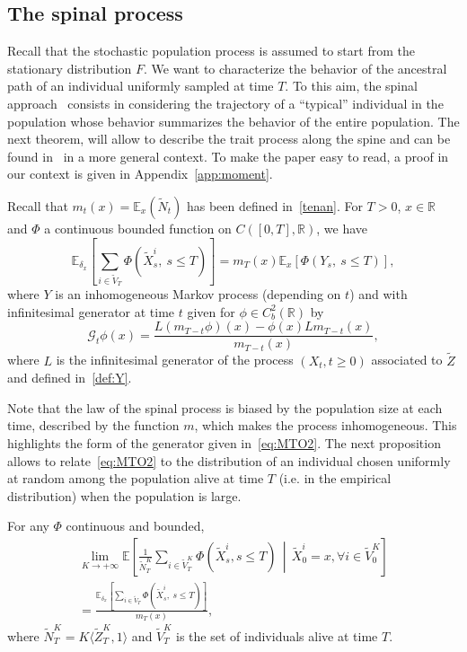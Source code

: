\documentclass[AHL,Unicode,longabstracts,published]{cedram}
\newcommand{\Go}{\mathcal{G}}
\newcommand*\R{\mathbb{R}}
\newcommand*\E{\mathbb{E}}
\let\oldforall\forall
\renewcommand*{\forall}{\mathrel{\oldforall}}
\begin{document}
\subsection{The spinal process} 
Recall that the stochastic population process is assumed to start from the stationary distribution $F$. We want to characterize the behavior of the ancestral path of an individual uniformly sampled at time $T$. To this aim, the spinal app\-roach~\cite{bansaye_limit_2011,hardyharris2,hardyharris3} consists in considering the trajectory of a ``typical'' individual in the population whose behavior summarizes the behavior of the entire population. The next theorem, will allow to describe the trait process along the spine and can be found in~\cite{Marguet2} in a more general context. To make the paper easy to read, a proof in our context is given in Appendix~\ref{app:moment}.
\begin{theo}\label{spine}
Recall that $m_t(x)=\E_x(\widetilde{N}_t)$ has been defined in~\eqref{tenan}. For $T>0$, $x\in \R$ and $\Phi$ a continuous bounded function on $C([0,T],\R)$, we have
\begin{equation}\label{eq:MTO2}
\E_{\delta_{x}}\left[\sum_{i \in \widetilde{V}_{T}}\Phi\left(\widetilde{X}^i_{s},\ s\leq T\right) \right]={m_{T}(x)}\E_{x}\left[\Phi\left(Y_{s},\ s\leq T\right) \right],
\end{equation}
where $Y$ is an inhomogeneous Markov process (depending on $t$) and with infinitesimal generator at time $t$ given for $\phi\in C_{b}^2(\R)$ by
\begin{equation}\label{eq:generatorG}
\Go_t \phi(x)=\frac{L\left(m_{T-t}\phi\right)(x)-\phi(x)Lm_{T-t}(x)}{m_{T-t}(x)},
\end{equation}
where $L$ is the infinitesimal generator of the process $(X_{t}, t\ge 0)$ associated to $\widetilde{Z}$ and defined in~\eqref{def:Y}.
\end{theo}


Note that the law of the spinal process is biased by the population size at each time, described by the function $m$, which makes the process inhomogeneous. This highlights the form of the generator given in~\eqref{eq:MTO2}. 
The next proposition allows to relate~\eqref{eq:MTO2} to the distribution of an individual chosen uniformly at random among the population alive at time $T$ (i.e. in the empirical distribution) when the population is large.


\begin{prop}\label{prop:LGN}
For any $\Phi$ continuous and bounded,
\begin{multline*}
\lim_{K \to +\infty}\E\left[\frac{1}{\widetilde N^K_{T}}\sum_{i \in \widetilde V^K_{T}}\Phi\left(\widetilde{X}^i_{s},  s\leq T\right) \, \middle|\, \widetilde{X}^i_{0} = x, \forall i\in \widetilde V^K_{0}\right]\\
 = \frac{\E_{\delta_{x}}\left[\sum\limits_{i \in \widetilde V_{T}}\Phi\left(\widetilde{X}^i_{s},\ s\leq T\right) \right]}{m_{T}(x)},
\end{multline*}
where $\widetilde N^K_{T} = K \langle \widetilde Z^K_{T},1\rangle$ and $\widetilde V^K_{T}$ is the set of individuals alive at time $T$.
\end{prop}
\end{document}
